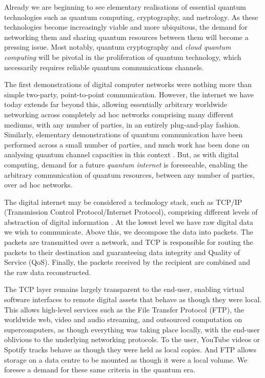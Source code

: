 \documentclass[aps,rmp,twocolumn,amsmath,amssymb,nofootinbib,superscriptaddress,longbibliography,floatfix]{revtex4-1}
\begin{document}
Already we are beginning to see elementary realisations of essential quantum technologies such as quantum computing, cryptography, and metrology. As these technologies become increasingly viable and more ubiquitous, the demand for networking them and sharing quantum resources between them will become a pressing issue. Most notably, quantum cryptography and \emph{cloud quantum computing} will be pivotal in the proliferation of quantum technology, which necessarily requires reliable quantum communications channels.

The first demonstrations of digital computer networks were nothing more than simple two-party, point-to-point communication. However, the internet we have today extends far beyond this, allowing essentially arbitrary worldwide networking across completely ad hoc networks comprising many different mediums, with any number of parties, in an entirely plug-and-play fashion. Similarly, elementary demonstrations of quantum communication have been performed across a small number of parties, and much work has been done on analysing quantum channel capacities in this context \cite{??? channel_capacity}. But, as with digital computing, demand for a future \emph{quantum internet} is foreseeable, enabling the arbitrary communication of quantum resources, between any number of parties, over ad hoc networks.

The digital internet may be considered a technology stack, such as TCP/IP (Transmission Control Protocol/Internet Protocol), comprising different levels of abstraction of digital information \cite{textbookOnNetworking}. At the lowest level we have raw digital data we wish to communicate. Above this, we decompose the data into packets. The packets are transmitted over a network, and TCP is responsible for routing the packets to their destination and guaranteeing data integrity and Quality of Service ({\sc QoS}). Finally, the packets received by the recipient are combined and the raw data reconstructed.

The TCP layer remains largely transparent to the end-user, enabling virtual software interfaces to remote digital assets that behave as though they were local. This allows high-level services such as the File Transfer Protocol (FTP), the worldwide web, video and audio streaming, and outsourced computation on supercomputers, as though everything was taking place locally, with the end-user oblivious to the underlying networking protocols. To the user, YouTube videos or Spotify tracks behave as though they were held as local copies. And FTP allows storage on a data centre to be mounted as though it were a local volume. We foresee a demand for these same criteria in the quantum era.
\end{document}
